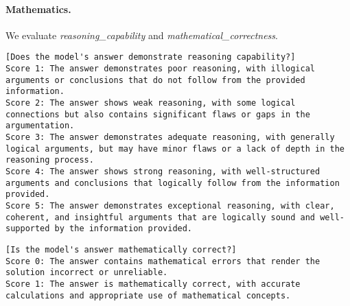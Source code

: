 \paragraph{Mathematics.} We evaluate \emph{reasoning\_capability} and \emph{mathematical\_correctness}.
\begin{lstlisting}[label=lst:judge_rubrics_math1,caption={Rubric used for the \emph{reasoning\_capability} criterion.}]
[Does the model's answer demonstrate reasoning capability?]
Score 1: The answer demonstrates poor reasoning, with illogical arguments or conclusions that do not follow from the provided information.
Score 2: The answer shows weak reasoning, with some logical connections but also contains significant flaws or gaps in the argumentation.
Score 3: The answer demonstrates adequate reasoning, with generally logical arguments, but may have minor flaws or a lack of depth in the reasoning process.
Score 4: The answer shows strong reasoning, with well-structured arguments and conclusions that logically follow from the information provided.
Score 5: The answer demonstrates exceptional reasoning, with clear, coherent, and insightful arguments that are logically sound and well-supported by the information provided.
\end{lstlisting}
\newpage
\begin{lstlisting}[label=lst:judge_rubrics_math2,caption={Rubric used for the \emph{mathematical\_correctness} criterion.}]
[Is the model's answer mathematically correct?]
Score 0: The answer contains mathematical errors that render the solution incorrect or unreliable.
Score 1: The answer is mathematically correct, with accurate calculations and appropriate use of mathematical concepts.
\end{lstlisting}

